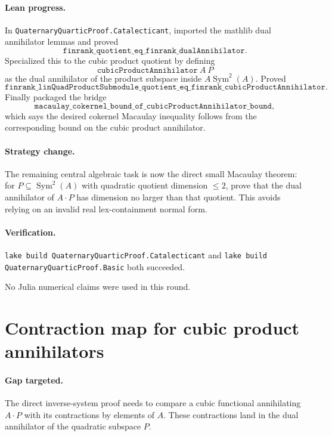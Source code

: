 \documentclass[11pt]{article}
\begin{document}
\paragraph{Lean progress.}
In \texttt{QuaternaryQuarticProof.Catalecticant}, imported the mathlib dual
annihilator lemmas and proved
\[
\texttt{finrank\_quotient\_eq\_finrank\_dualAnnihilator}.
\]
Specialized this to the cubic product quotient by defining
\[
\texttt{cubicProductAnnihilator}\ A\ P
\]
as the dual annihilator of the product subspace inside
\(A\operatorname{Sym}^2(A)\).  Proved
\[
\texttt{finrank\_linQuadProductSubmodule\_quotient\_eq\_finrank\_cubicProductAnnihilator}.
\]
Finally packaged the bridge
\[
\texttt{macaulay\_cokernel\_bound\_of\_cubicProductAnnihilator\_bound},
\]
which says the desired cokernel Macaulay inequality follows from the
corresponding bound on the cubic product annihilator.

\paragraph{Strategy change.}
The remaining central algebraic task is now the direct small Macaulay theorem:
for \(P\subseteq\operatorname{Sym}^2(A)\) with quadratic quotient dimension
\(\le2\), prove that the dual annihilator of \(A\cdot P\) has dimension no
larger than that quotient.  This avoids relying on an invalid real
lex-containment normal form.

\paragraph{Verification.}
\texttt{lake build QuaternaryQuarticProof.Catalecticant} and
\texttt{lake build QuaternaryQuarticProof.Basic} both succeeded.

No Julia numerical claims were used in this round.

\section*{Contraction map for cubic product annihilators}

\paragraph{Gap targeted.}
The direct inverse-system proof needs to compare a cubic functional
annihilating \(A\cdot P\) with its contractions by elements of \(A\).  These
contractions land in the dual annihilator of the quadratic subspace \(P\).
\end{document}
